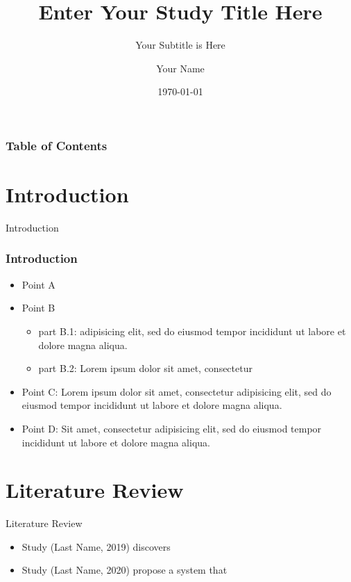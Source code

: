 \documentclass[10pt]{beamer}
\title[University of Wisconsin Milwaukee]{Enter Your Study Title Here}
\subtitle{ Your Subtitle is Here}
\author[Your Name]{Your Name}
\institute[]{University of Wisconsin Milwaukee}
\date[\textcolor{white}{\today} ]
{\today}
\begin{document}
    \frame{\titlepage}
    \begin{frame}
        \frametitle{Table of Contents}
        \tableofcontents
    \end{frame}



    \section{Introduction}
    \begin{frame}{Introduction}
        \frametitle{Introduction}
        \begin{itemize}
            \item Point A
            \item Point B
            \begin{itemize}
                \item part B.1: adipisicing elit, sed do eiusmod tempor incididunt ut labore et dolore magna aliqua.
                \item part B.2: Lorem ipsum dolor sit amet, consectetur
            \end{itemize}
            \item Point C: Lorem ipsum dolor sit amet, consectetur adipisicing elit, sed do eiusmod tempor incididunt ut labore et dolore magna aliqua.
            \item Point D: Sit amet, consectetur adipisicing elit, sed do eiusmod tempor incididunt ut labore et dolore magna aliqua.
        \end{itemize}
    \end{frame}


    \section{Literature Review}

    \begin{frame}{Literature Review}


        \begin{itemize}
            \item  Study (Last Name, 2019) discovers
            \item  Study (Last Name, 2020) propose a system that
        \end{itemize}
    \end{frame}
\end{document}
